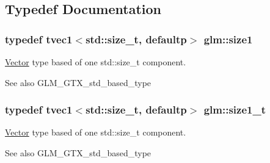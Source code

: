 \subsection{Typedef Documentation}
\hypertarget{group__gtx__std__based__type_ga3550330d27cef40f7694130b501be73a}{}
\subsubsection[{size1}]{\setlength{\rightskip}{0pt plus 5cm}typedef tvec1$<$std\+::size\+\_\+t, defaultp$>$ {\bf glm\+::size1}}\label{group__gtx__std__based__type_ga3550330d27cef40f7694130b501be73a}
\hyperlink{class_vector}{Vector} type based of one std\+::size\+\_\+t component. \begin{DoxySeeAlso}{See also}
G\+L\+M\+\_\+\+G\+T\+X\+\_\+std\+\_\+based\+\_\+type 
\end{DoxySeeAlso}
\hypertarget{group__gtx__std__based__type_ga9a9525491009d0df7bcc964b1e2e5745}{}
\subsubsection[{size1\+\_\+t}]{\setlength{\rightskip}{0pt plus 5cm}typedef tvec1$<$std\+::size\+\_\+t, defaultp$>$ {\bf glm\+::size1\+\_\+t}}\label{group__gtx__std__based__type_ga9a9525491009d0df7bcc964b1e2e5745}
\hyperlink{class_vector}{Vector} type based of one std\+::size\+\_\+t component. \begin{DoxySeeAlso}{See also}
G\+L\+M\+\_\+\+G\+T\+X\+\_\+std\+\_\+based\+\_\+type 
\end{DoxySeeAlso}
\hypertarget{group__gtx__std__based__type_gab8b434ee2ba109726915e977c6aca22a}{}
